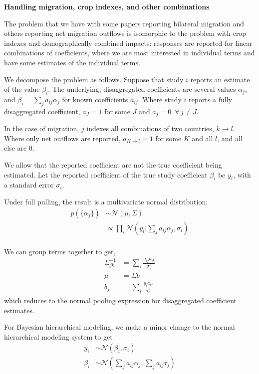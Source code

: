 \documentclass[12pt, oneside]{amsart}
\begin{document}
{\bf Handling migration, crop indexes, and other combinations}

The problem that we have with some papers reporting bilateral
migration and others reporting net migration outflows is isomorphic to
the problem with crop indexes and demographically combined impacts:
responses are reported for linear combinations of coefficients, where
we are most interested in individual terms and have some estimates of
the individual terms.

We decompose the problem as follows.  Suppose that study $i$ reports
an estimate of the value $\beta_i$.  The underlying, disaggregated
coefficients are several values $\alpha_j$, and
$\beta_i = \sum_j a_{ij} \alpha_j$ for known coefficients $a_{ij}$.
Where study $i$ reports a fully disaggregated coefficient, $a_J = 1$
for some $J$ and $a_j = 0\,\,\,\forall\, j \ne J$.

In the case of migration, $j$ indexes all combinations of two
countries, $k \rightarrow l$.  Where only net outflows are reported,
$a_{K \rightarrow l} = 1$ for some $K$ and all $l$, and all else are
0.

We allow that the reported coefficient are not the true coefficient
being estimated.  Let the reported coefficient of the true study
coefficient $\beta_i$ be $y_i$, with a standard error
$\sigma_i$.

Under full pulling, the result is a multivariate normal distribution:
\begin{align*}
  p(\{\alpha_j\}) &\sim \mathcal{N}\left(\mu, \Sigma\right) \\
                  &\propto \prod_i \mathcal{N}\left(y_i | \sum_j a_{ij}
                    \alpha_j, \sigma_i\right) \\
\end{align*}

We can group terms together to get,
\begin{align*}
  \Sigma^{-1}_{jk} &= \sum_i \frac{a_{ij} a_{ik}}{\sigma_i^2} \\
  \mu &= \Sigma b \\
  b_j &= \sum_i \frac{y_i a_{ij}}{\sigma_i^2}
\end{align*}
which reduces to the normal pooling expression for disaggregated
coefficient estimates.

For Bayesian hierarchical modeling, we make a minor change to the
normal hierarchical modeling system to get
\begin{align*}
  y_i & \sim \mathcal{N}\left(\beta_i, \sigma_i\right) \\
  \beta_i & \sim \mathcal{N}\left(\sum_j a_{ij} \alpha_j, \sum_j a_{ij} \tau_j\right) \\
\end{align*}
\end{document}

